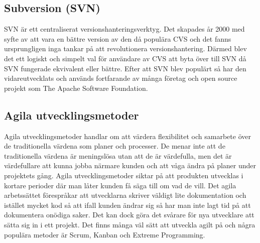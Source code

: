\subsection{Subversion (SVN)}
SVN är ett centraliserat versionshanteringsverktyg. Det skapades år 2000 med syfte av att vara en bättre version av den då populära CVS och det fanns ursprungligen inga tankar på att revolutionera versionshantering. Därmed blev det ett logiskt och simpelt val för användare av CVS att byta över till SVN då SVN fungerade ekvivalent eller bättre. Efter att SVN blev populärt så har den vidareutvecklats och används fortfarande av många företag\cite{vcs-popularity} och open source projekt som The Apache Software Foundation\cite{apache-dev-svn}.\cite{svn-book}

\subsection{Agila utvecklingsmetoder}
Agila utvecklingsmetoder handlar om att värdera flexibilitet och samarbete över de traditionella värdena som planer och processer. De menar inte att de traditionella värdena är meningslösa utan att de är värdefulla, men det är värdefullare att kunna jobba närmare kunden och att våga ändra på planer under projektets gång. Agila utvecklingsmetoder siktar på att produkten utvecklas i kortare perioder där man låter kunden få säga till om vad de vill. Det agila arbetssättet förespråkar att utvecklarna skriver väldigt lite dokumentation och istället mycket kod så att ifall kunden ändrar sig så har man inte lagt tid på att dokumentera onödiga saker. Det kan dock göra det svårare för nya utvecklare att sätta sig in i ett projekt.
Det finns många väl sätt att utveckla agilt på och några populära metoder är Scrum, Kanban och Extreme Programming.